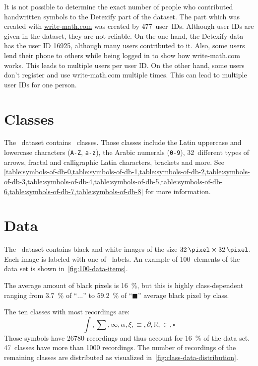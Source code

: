 It is not possible to determine the exact number of people who contributed
handwritten symbols to the Detexify part of the dataset. The part which was
created with \href{http://write-math.com}{write-math.com} was created by
477~user~IDs. Although user IDs are given in the dataset, they are not
reliable. On the one hand, the Detexify data has the user ID 16925,
although many users contributed to it. Also, some users lend their phone to
others while being logged in to show how write-math.com works. This leads to
multiple users per user ID. On the other hand, some users don't register and
use write-math.com multiple times. This can lead to multiple user IDs for one
person.

\section{Classes}
The \dbNameVersion~dataset contains \dbTotalClasses~classes. Those classes include the
Latin uppercase and lowercase characters (\verb+A-Z+, \verb+a-z+), the Arabic
numerals (\verb+0-9+), 32~different types of arrows, fractal and calligraphic
Latin characters, brackets and more. See \cref{table:symbols-of-db-0,table:symbols-of-db-1,table:symbols-of-db-2,table:symbols-of-db-3,table:symbols-of-db-4,table:symbols-of-db-5,table:symbols-of-db-6,table:symbols-of-db-7,table:symbols-of-db-8} for more information.

\section{Data}
The \dbNameVersion~dataset contains \dbTotalInstances{} black and white images
of the size $\SI{32}{\pixel} \times \SI{32}{\pixel}$. Each image is labeled
with one of \dbTotalClasses~labels. An example of 100~elements of the
\dbNameVersion{} data set is shown in~\cref{fig:100-data-items}.

The average amount of black pixels is \SI{16}{\percent}, but this is highly
class-dependent ranging from \SI{3.7}{\percent} of \enquote{$\dotsc$} to \SI{59.2}{\percent} of \enquote{$\blacksquare$} average
black pixel by class.

The ten classes with most recordings are:
\[\int, \sum, \infty, \alpha, \xi, \equiv, \partial, \mathds{R}, \in, \square\]
Those symbols have \num{26780} recordings and thus account for
\SI{16}{\percent} of the data set. 47~classes have more than \num{1000}
recordings. The number of recordings of the remaining classes are distributed
as visualized in~\cref{fig:class-data-distribution}.

